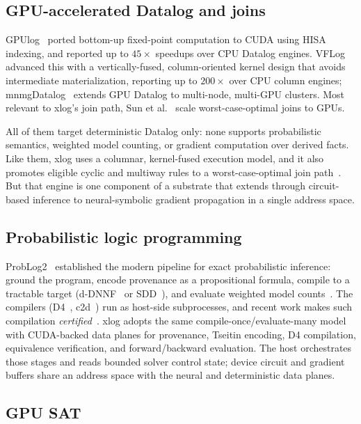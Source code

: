 \subsection{GPU-accelerated Datalog and joins}

GPUlog~\cite{gpulog} ported bottom-up fixed-point computation to CUDA using HISA indexing, and reported up to $45\times$ speedups over CPU Datalog engines. VFLog~\cite{vflog} advanced this with a vertically-fused, column-oriented kernel design that avoids intermediate materialization, reporting up to $200\times$ over CPU column engines; mnmgDatalog~\cite{mnmgdatalog} extends GPU Datalog to multi-node, multi-GPU clusters. Most relevant to xlog's join path, Sun et al.~\cite{sungpuwcoj} scale worst-case-optimal joins to GPUs.

All of them target deterministic Datalog only: none supports probabilistic semantics, weighted model counting, or gradient computation over derived facts. Like them, xlog uses a columnar, kernel-fused execution model, and it also promotes eligible cyclic and multiway rules to a worst-case-optimal join path~\cite{ngo2018wcoj,veldhuizen2014leapfrog,wang2023freejoin}. But that engine is one component of a substrate that extends through circuit-based inference to neural-symbolic gradient propagation in a single address space.

\subsection{Probabilistic logic programming}

ProbLog2~\cite{problog2} established the modern pipeline for exact probabilistic inference: ground the program, encode provenance as a propositional formula, compile to a tractable target (d-DNNF~\cite{darwiche2001dnnf} or SDD~\cite{sdd}), and evaluate weighted model counts~\cite{chaviraDarwiche2008}. The compilers (D4~\cite{d4compiler}, c2d~\cite{c2d}) run as host-side subprocesses, and recent work makes such compilation \emph{certified}~\cite{capelli2019}. xlog adopts the same compile-once/evaluate-many model with CUDA-backed data planes for provenance, Tseitin encoding, D4 compilation, equivalence verification, and forward/backward evaluation. The host orchestrates those stages and reads bounded solver control state; device circuit and gradient buffers share an address space with the neural and deterministic data planes.

\subsection{GPU SAT}

